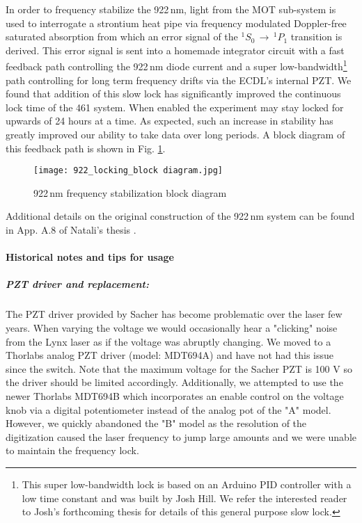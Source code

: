 In order to frequency stabilize the 922\,nm, light from the MOT sub-system is used to interrogate a strontium heat pipe via frequency modulated Doppler-free saturated absorption from which an error signal of the $^1S_0\,\rightarrow\,^1P_1$ transition is derived.
This error signal is sent into a homemade integrator circuit with a fast feedback path controlling the 922\,nm diode current and a super low-bandwidth\footnote{This super low-bandwidth lock is based on an Arduino PID controller with a low time constant and was built by Josh Hill.
We refer the interested reader to Josh's forthcoming thesis for details of this general purpose slow lock.} 
path controlling for long term frequency drifts via the ECDL's internal PZT.
We found that addition of this slow lock has significantly improved the continuous lock time of the 461 system. 
When enabled the experiment may stay locked for upwards of 24 hours at a time. 
As expected, such an increase in stability has greatly improved our ability to take data over long periods.
A block diagram of this feedback path is shown in Fig. \ref{fig:922freqLock}.
	\begin{figure}
		\centerline{
		\texttt{[image: 922\_locking\_block diagram.jpg]}}
		\caption{922\,nm frequency stabilization block diagram}{}
		\label{fig:922freqLock}
	\end{figure} 

Additional details on the original construction of the 922\,nm system can be found in App. A.8 of Natali's thesis \cite{MartinezdeEscolar2010}.

\paragraph{Historical notes and tips for usage}
\subparagraph{PZT driver and replacement:}
The PZT driver provided by Sacher has become problematic over the laser few years.
When varying the voltage we would occasionally hear a "clicking" noise from the Lynx laser as if the voltage was abruptly changing.
We moved to a Thorlabs analog PZT driver (model: MDT694A) and have not had this issue since the switch.
Note that the maximum voltage for the Sacher PZT is 100 V so the driver should be limited accordingly.
Additionally, we attempted to use the newer Thorlabs MDT694B which incorporates an enable control on the voltage knob via a digital potentiometer instead of the analog pot of the "A" model.
However, we quickly abandoned the "B" model as the resolution of the digitization caused the laser frequency to jump large amounts and we were unable to maintain the frequency lock.

